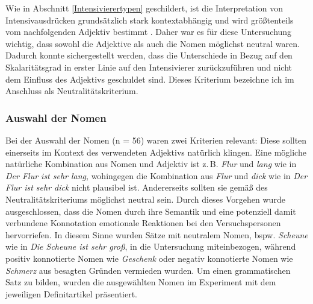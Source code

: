 Wie in Abschnitt \ref{Intensivierertypen} geschildert, ist die Interpretation von Intensivausdrücken grundsätzlich stark kontextabhängig und wird größtenteils vom nachfolgenden Adjektiv bestimmt \citep[vgl.][27]{Paradis.1997}. Daher war es für diese Untersuchung wichtig, dass sowohl die Adjektive als auch die Nomen möglichst neutral waren. Dadurch konnte sichergestellt werden, dass die Unterschiede in Bezug auf den Skalaritätsgrad in erster Linie auf den Intensivierer zurückzuführen und nicht dem Einfluss des Adjektivs geschuldet sind. Dieses Kriterium bezeichne ich im Anschluss als Neutralitätskriterium. 




\subsubsection{Auswahl der Nomen}
Bei der Auswahl der Nomen (n = 56) waren zwei Kriterien relevant: Diese sollten einerseits im Kontext des verwendeten Adjektivs natürlich klingen. Eine mögliche natürliche Kombination aus Nomen und Adjektiv ist z.\,B. \textit{Flur} und \textit{lang} wie in \textit{Der Flur ist sehr lang}, wohingegen die Kombination aus \textit{Flur} und \textit{dick} wie in \textit{Der Flur ist sehr dick} nicht plausibel ist. Andererseits sollten sie gemäß des Neutralitätskriteriums möglichst neutral sein. Durch dieses Vorgehen wurde ausgeschlossen, dass die Nomen durch ihre Semantik und eine potenziell damit verbundene Konnotation emotionale Reaktionen bei den Versuchspersonen hervorriefen. In diesem Sinne wurden Sätze mit neutralem Nomen, bspw. \textit{Scheune} wie in \textit{Die Scheune ist sehr groß}, in die Untersuchung miteinbezogen, während positiv konnotierte Nomen wie \textit{Geschenk} oder negativ konnotierte Nomen wie \textit{Schmerz} aus besagten Gründen vermieden wurden. Um einen grammatischen Satz zu bilden, wurden die ausgewählten Nomen im Experiment mit dem jeweiligen {Definitartikel präsentiert.}



